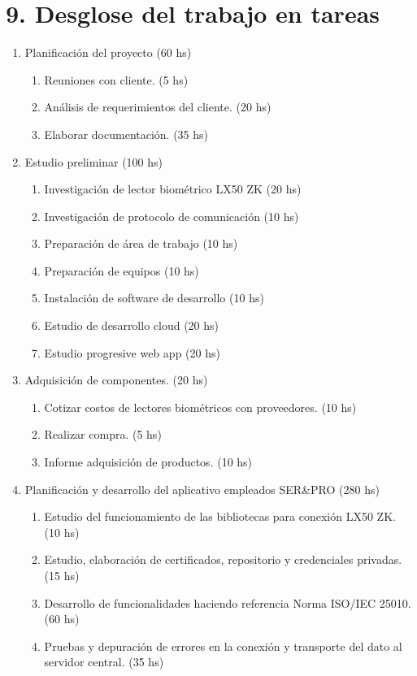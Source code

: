 \documentclass[
11pt, %
]{charter}
\begin{document}
\section{9. Desglose del trabajo en tareas}
\label{sec:wbs}


\begin{enumerate}
\item Planificación del proyecto (60 hs)
	\begin{enumerate}
	\item Reuniones con cliente. (5 hs)
	\item Análisis de requerimientos del cliente. (20 hs)
	\item Elaborar documentación. (35 hs)
	\end{enumerate}
\item Estudio preliminar (100 hs)
	\begin{enumerate}
	\item Investigación de lector biométrico LX50 ZK (20 hs)
	\item Investigación de protocolo de comunicación (10 hs)
	\item Preparación de área de trabajo (10 hs)
	\item Preparación de equipos (10 hs)
	\item Instalación de software de desarrollo (10 hs)
	\item Estudio de desarrollo cloud (20 hs)
	\item Estudio progresive web app (20 hs)
	\end{enumerate}
\item Adquisición de componentes. (20 hs)
	\begin{enumerate}
	\item Cotizar costos de lectores biométricos con proveedores. (10 hs)
	\item Realizar compra. (5 hs)
	\item Informe adquisición de productos. (10 hs)
	\end{enumerate}
\item Planificación y desarrollo del aplicativo empleados SER\&PRO (280 hs)
	\begin{enumerate}
	\item Estudio del funcionamiento de las bibliotecas para conexión LX50 ZK. (10 hs)
	\item Estudio, elaboración de certificados, repositorio y credenciales privadas. (15 hs)
	\item Desarrollo de funcionalidades haciendo referencia Norma ISO/IEC 25010. (60 hs)
	\item Pruebas y depuración de errores en la conexión y transporte del dato al servidor
central. (35 hs)
	

\end{enumerate}
\end{enumerate}
\end{document}
